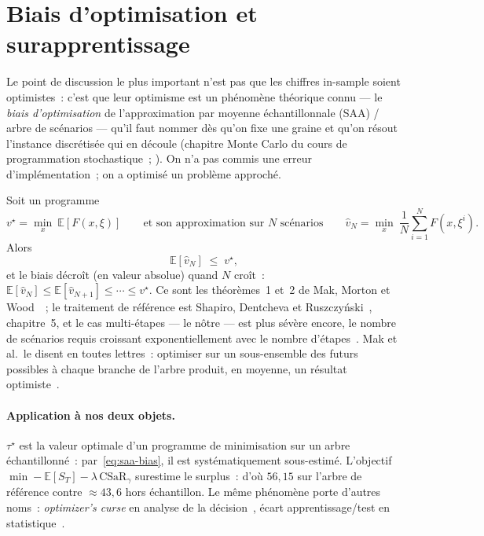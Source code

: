 \documentclass[11pt,letterpaper]{article}
\newcommand{\E}{\mathbb{E}}
\newcommand{\CSaR}{\mathrm{CSaR}}
\newcommand{\taustar}{\tau^{\star}}
\theoremstyle{definition}
\begin{document}
\section{Biais d'optimisation et surapprentissage}\label{ssec:biais-saa}

Le point de discussion le plus important n'est pas que les chiffres
in-sample soient optimistes~: c'est que leur optimisme est un phénomène
théorique connu --- le \emph{biais d'optimisation} de l'approximation par
moyenne échantillonnale (SAA) / arbre de scénarios --- qu'il faut nommer dès
qu'on fixe une graine et qu'on résout l'instance discrétisée qui en découle
(chapitre Monte Carlo du cours de programmation stochastique~;
\cite{Mak1999,Shapiro2003}). On n'a pas commis une erreur d'implémentation~;
on a optimisé un problème approché.

Soit un programme
\[
v^\star = \min_x\ \E[F(x,\xi)]
\qquad\text{et son approximation sur $N$ scénarios}\qquad
\hat v_N = \min_x\ \frac1N \sum_{i=1}^N F(x,\xi^i).
\]
Alors
\begin{equation}\label{eq:saa-bias}
\E[\hat v_N] \;\le\; v^\star,
\end{equation}
et le biais décroît (en valeur absolue) quand $N$ croît~:
$\E[\hat v_N] \le \E[\hat v_{N+1}] \le \cdots \le v^\star$. Ce sont les
théorèmes~1 et~2 de Mak, Morton et Wood~\cite{Mak1999}~; le traitement de
référence est Shapiro, Dentcheva et Ruszczyński~\cite{ShapiroDentchevaRusz2021},
chapitre~5, et le cas multi-étapes --- le nôtre --- est plus sévère encore, le
nombre de scénarios requis croissant exponentiellement avec le nombre
d'étapes~\cite{Shapiro2003}. Mak et al.\ le disent en toutes lettres~:
optimiser sur un sous-ensemble des futurs possibles à chaque branche de
l'arbre produit, en moyenne, un résultat optimiste~\cite[p.~55]{Mak1999}.

\paragraph{Application à nos deux objets.}
$\taustar$ est la valeur optimale d'un programme de minimisation sur un arbre
échantillonné~: par~\eqref{eq:saa-bias}, il est systématiquement sous-estimé.
L'objectif $\min -\E[S_T] - \lambda\,\CSaR_\gamma$ surestime le surplus~:
d'où $56{,}15$ sur l'arbre de référence contre $\approx 43{,}6$ hors
échantillon. Le même phénomène porte d'autres noms~: \emph{optimizer's
curse} en analyse de la décision~\cite{SmithWinkler2006}, écart
apprentissage/test en statistique~\cite{Hastie2009}.
\end{document}
